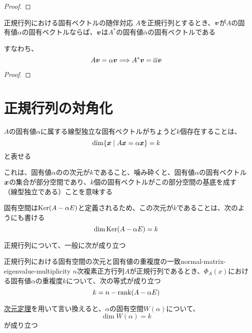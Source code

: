 \documentclass[../../../topic_linear-algebra]{subfiles}
\begin{document}
\begin{proof}
\end{proof}

\br

\begin{theorem*}{正規行列における固有ベクトルの随伴対応}
  $A$を正規行列とするとき、$\vb*{v}$が$A$の固有値$\alpha$の固有ベクトルならば、$\vb*{v}$は$A^*$の固有値$\overline{\alpha}$の固有ベクトルである

  すなわち、
  \begin{equation*}
    A\vb*{v} = \alpha \vb*{v} \Longrightarrow A^*\vb*{v} = \overline{\alpha} \vb*{v}
  \end{equation*}
\end{theorem*}

\begin{proof}
\end{proof}

\sectionline
\section{正規行列の対角化}

$A$の固有値$\alpha$に属する線型独立な固有ベクトルがちょうど$k$個存在することは、
\begin{equation*}
  \dim \{\vb*{x} \mid A\vb*{x} = \alpha \vb*{x} \} = k
\end{equation*}
と表せる

これは、固有値$\alpha$のの次元が$k$であること、噛み砕くと、固有値$\alpha$の固有ベクトル$\vb*{x}$の集合が部分空間であり、$k$個の固有ベクトルがこの部分空間の基底を成す（線型独立である）ことを意味する

\br

固有空間は$\operatorname{Ker}(A - \alpha E)$と定義されるため、この次元が$k$であることは、次のようにも書ける
\begin{equation*}
  \dim \operatorname{Ker}(A - \alpha E) = k
\end{equation*}

\br

正規行列について、一般に次が成り立つ

\begin{theorem}{正規行列における固有空間の次元と固有値の重複度の一致}{normal-matrix-eigenvalue-multiplicity}
  $n$次複素正方行列$A$が正規行列であるとき、$\Phi_A(x)$における固有値$\alpha$の重複度$k$について、次の等式が成り立つ
  \begin{equation*}
    k = n - \rank(A - \alpha E)
  \end{equation*}

  \hyperref[thm:rank-nullity-theorem]{次元定理}を用いて言い換えると、$\alpha$の固有空間$W(\alpha)$について、
  \begin{equation*}
    \dim W(\alpha) = k
  \end{equation*}
  が成り立つ
\end{theorem}
\end{document}
